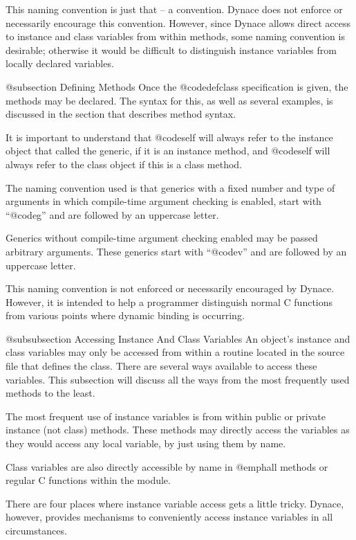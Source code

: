 This naming convention is just that -- a convention.  Dynace does
not enforce or necessarily encourage this convention.  However,
since Dynace allows direct access to instance and class variables
from within methods, some naming convention is desirable; otherwise
it would be difficult to distinguish instance variables from locally
declared variables.

@subsection Defining Methods
Once the @code{defclass} specification is given, the methods may be
declared.  The syntax for this, as well as several examples, is discussed
in the section that describes method syntax.

It is important to understand that @code{self} will always refer to the
instance object that called the generic, if it is an instance method,
and @code{self} will always refer to the class object if this is a
class method.

The naming convention used is that generics with a fixed number and
type of arguments in which compile-time argument checking is enabled,
start with ``@code{g}'' and are followed by an uppercase letter.

Generics without compile-time argument checking enabled may be passed
arbitrary arguments.  These generics start with ``@code{v}'' and are
followed by an uppercase letter.

This naming convention is not enforced or necessarily encouraged by
Dynace.  However, it is intended to help a programmer distinguish normal
C functions from various points where dynamic binding is occurring.


@subsubsection Accessing Instance And Class Variables
An object's instance and class variables may only be accessed from
within a routine located in the source file that defines the class.
There are several ways available to access these variables.  This
subsection will discuss all the ways from the most frequently used
methods to the least.

The most frequent use of instance variables is from within public or
private instance (not class) methods.  These methods may directly access
the variables as they would access any local variable, by just using
them by name.

Class variables are also directly accessible by name in @emph{all}
methods or regular C functions within the module.

There are four places where instance variable access gets a little tricky.
Dynace, however, provides mechanisms to conveniently access instance
variables in all circumstances.

